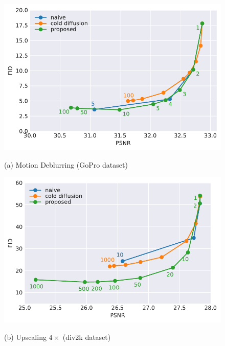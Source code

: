 \begin{figure}[t]
\small
    \centering
    \begin{minipage}[c]{.48\textwidth}
    \centering
    \includegraphics[width=0.95\linewidth]{assets/pd_curve_gopro_sampler.pdf} \vspace{-.5em}
    
    (a) Motion Deblurring (GoPro dataset)
    \end{minipage}
    \begin{minipage}[c]{.48\textwidth}
    \centering
    \includegraphics[width=0.95\linewidth]{assets/pd_curve_sisr_4x_div2k_sampler.pdf} \vspace{-.5em}
    
        (b) Upscaling $4\times$ (div2k dataset)
    \end{minipage}
    

\end{figure}
